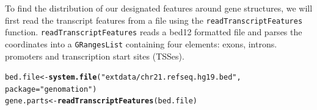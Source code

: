 \documentclass{article}\usepackage[]{graphicx}\usepackage[]{color}
\makeatletter
\newcommand{\hlstr}[1]{\textcolor[rgb]{0.192,0.494,0.8}{#1}}%
\newcommand{\hlstd}[1]{\textcolor[rgb]{0.345,0.345,0.345}{#1}}%
\newcommand{\hlkwb}[1]{\textcolor[rgb]{0.69,0.353,0.396}{#1}}%
\newcommand{\hlkwc}[1]{\textcolor[rgb]{0.333,0.667,0.333}{#1}}%
\newcommand{\hlkwd}[1]{\textcolor[rgb]{0.737,0.353,0.396}{\textbf{#1}}}%
\newenvironment{kframe}{%
 \def\at@end@of@kframe{}%
 \ifinner\ifhmode%
  \def\at@end@of@kframe{\end{minipage}}%
  \begin{minipage}{\columnwidth}%
 \fi\fi%
 \def\FrameCommand##1{\hskip\@totalleftmargin \hskip-\fboxsep
 \colorbox{shadecolor}{##1}\hskip-\fboxsep
     \hskip-\linewidth \hskip-\@totalleftmargin \hskip\columnwidth}%
 \MakeFramed {\advance\hsize-\width
   \@totalleftmargin\z@ \linewidth\hsize
   \@setminipage}}%
 {\par\unskip\endMakeFramed%
 \at@end@of@kframe}
\newenvironment{knitrout}{}{} %
\newcommand{\Rcode}[1]{{\texttt{#1}}}
\makeatother
\begin{document}
To find the distribution of our designated features around gene structures, 
we will first read the transcript features from a file using the 
\Rcode{readTranscriptFeatures} function. \Rcode{readTranscriptFeatures} reads
a bed12 formatted file and parses the coordinates into a \Rcode{GRangesList} containing
four elements: exons, introns. promoters and transcription start sites (TSSes).
\begin{knitrout}
\color{fgcolor}\begin{kframe}
\begin{alltt}
\hlstd{bed.file} \hlkwb{<-} \hlkwd{system.file}\hlstd{(}\hlstr{"extdata/chr21.refseq.hg19.bed"}\hlstd{,}
    \hlkwc{package} \hlstd{=} \hlstr{"genomation"}\hlstd{)}
\hlstd{gene.parts} \hlkwb{<-} \hlkwd{readTranscriptFeatures}\hlstd{(bed.file)}
\end{alltt}


{\ttfamily\noindent\itshape\color{messagecolor}{\#\# Reading the table...
\\\#\# Calculating intron coordinates...
\\\#\# Calculating exon coordinates...
\\\#\# Calculating TSS coordinates...
\\\#\# Calculating promoter coordinates...
\\\#\# Outputting the final GRangesList...
}}\end{kframe}
\end{knitrout}
\end{document}
